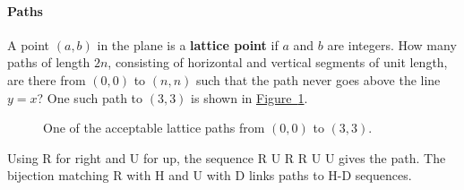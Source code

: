 \documentclass[10pt,]{book}
\newcommand{\terminology}[1]{\textbf{#1}}
\theoremstyle{plain}
\theoremstyle{definition}
\theoremstyle{definition}
\theoremstyle{definition}
\theoremstyle{definition}
\numberwithin{equation}{chapter}
\begin{document}
\paragraph[{Paths}]{Paths}\hypertarget{paragraphs-9}{}
\hypertarget{p-900}{}%
A point \((a, b)\) in the plane is a \terminology{lattice point} if \(a\) and \(b\) are integers. How many paths of length \(2n\), consisting of horizontal and vertical segments of unit length, are there from \((0, 0)\) to \((n, n)\) such that the path never goes above the line \(y = x\)? One such path to \((3, 3)\) is shown in \hyperref[catalanpathex]{Figure~\ref{catalanpathex}}.%
\begin{figure}
\centering
{
}
\caption{One of the acceptable lattice paths from \((0,0)\) to \((3,3)\).\label{catalanpathex}}
\end{figure}
\hypertarget{p-901}{}%
Using R for right and U for up, the sequence R U R R U U gives the path. The bijection matching R with H and U with D links paths to H-D sequences.%
\typeout{************************************************}
\typeout{************************************************}
\end{document}
